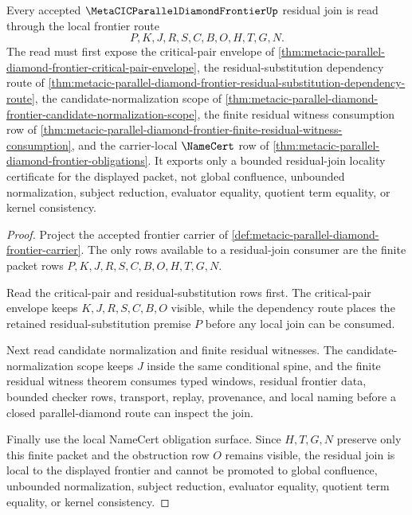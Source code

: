 \begin{theorem}
\label{thm:metacic-parallel-diamond-frontier-residual-join-locality}
Every accepted $\MetaCICParallelDiamondFrontierUp$ residual join is read through the local frontier route
$$
P,K,J,R,S,C,B,O,H,T,G,N .
$$
The read must first expose the critical-pair envelope of \autoref{thm:metacic-parallel-diamond-frontier-critical-pair-envelope}, the residual-substitution dependency route of \autoref{thm:metacic-parallel-diamond-frontier-residual-substitution-dependency-route}, the candidate-normalization scope of \autoref{thm:metacic-parallel-diamond-frontier-candidate-normalization-scope}, the finite residual witness consumption row of \autoref{thm:metacic-parallel-diamond-frontier-finite-residual-witness-consumption}, and the carrier-local $\NameCert$ row of \autoref{thm:metacic-parallel-diamond-frontier-obligations}. It exports only a bounded residual-join locality certificate for the displayed packet, not global confluence, unbounded normalization, subject reduction, evaluator equality, quotient term equality, or kernel consistency.
\end{theorem}
\begin{proof}
Project the accepted frontier carrier of \autoref{def:metacic-parallel-diamond-frontier-carrier}. The only rows available to a residual-join consumer are the finite packet rows $P,K,J,R,S,C,B,O,H,T,G,N$.

Read the critical-pair and residual-substitution rows first. The critical-pair envelope keeps $K,J,R,S,C,B,O$ visible, while the dependency route places the retained residual-substitution premise $P$ before any local join can be consumed.

Next read candidate normalization and finite residual witnesses. The candidate-normalization scope keeps $J$ inside the same conditional spine, and the finite residual witness theorem consumes typed windows, residual frontier data, bounded checker rows, transport, replay, provenance, and local naming before a closed parallel-diamond route can inspect the join.

Finally use the local NameCert obligation surface. Since $H,T,G,N$ preserve only this finite packet and the obstruction row $O$ remains visible, the residual join is local to the displayed frontier and cannot be promoted to global confluence, unbounded normalization, subject reduction, evaluator equality, quotient term equality, or kernel consistency.
\end{proof}

